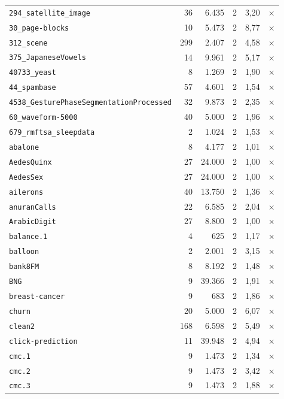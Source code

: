 \begin{longtable}{lrrrrc}
    \texttt{294\_satellite\_image} & 36 & 6.435 & 2 & 3,20 & $\times$ \\
    \texttt{30\_page-blocks} & 10 & 5.473 & 2 & 8,77 & $\times$ \\
    \texttt{312\_scene} & 299 & 2.407 & 2 & 4,58 & $\times$ \\
    \texttt{375\_JapaneseVowels} & 14 & 9.961 & 2 & 5,17 & $\times$ \\
    \texttt{40733\_yeast} & 8 & 1.269 & 2 & 1,90 & $\times$ \\
    \texttt{44\_spambase} & 57 & 4.601 & 2 & 1,54 & $\times$ \\
    \texttt{4538\_GesturePhaseSegmentationProcessed} & 32 & 9.873 & 2 & 2,35 & $\times$ \\
    \texttt{60\_waveform-5000} & 40 & 5.000 & 2 & 1,96 & $\times$ \\
    \texttt{679\_rmftsa\_sleepdata} & 2 & 1.024 & 2 & 1,53 & $\times$ \\
    \texttt{abalone} & 8 & 4.177 & 2 & 1,01 & $\times$ \\
    \texttt{AedesQuinx} & 27 & 24.000 & 2 & 1,00 & $\times$ \\
    \texttt{AedesSex} & 27 & 24.000 & 2 & 1,00 & $\times$ \\
    \texttt{ailerons} & 40 & 13.750 & 2 & 1,36 & $\times$ \\
    \texttt{anuranCalls} & 22 & 6.585 & 2 & 2,04 & $\times$ \\
    \texttt{ArabicDigit} & 27 & 8.800 & 2 & 1,00 & $\times$ \\
    \texttt{balance.1} & 4 & 625 & 2 & 1,17 & $\times$ \\
    \texttt{balloon} & 2 & 2.001 & 2 & 3,15 & $\times$ \\
    \texttt{bank8FM} & 8 & 8.192 & 2 & 1,48 & $\times$ \\
    \texttt{BNG} & 9 & 39.366 & 2 & 1,91 & $\times$ \\
    \texttt{breast-cancer} & 9 & 683 & 2 & 1,86 & $\times$ \\
    \texttt{churn} & 20 & 5.000 & 2 & 6,07 & $\times$ \\
    \texttt{clean2} & 168 & 6.598 & 2 & 5,49 & $\times$ \\
    \texttt{click-prediction} & 11 & 39.948 & 2 & 4,94 & $\times$ \\
    \texttt{cmc.1} & 9 & 1.473 & 2 & 1,34 & $\times$ \\
    \texttt{cmc.2} & 9 & 1.473 & 2 & 3,42 & $\times$ \\
    \texttt{cmc.3} & 9 & 1.473 & 2 & 1,88 & $\times$ \\

\end{longtable}
